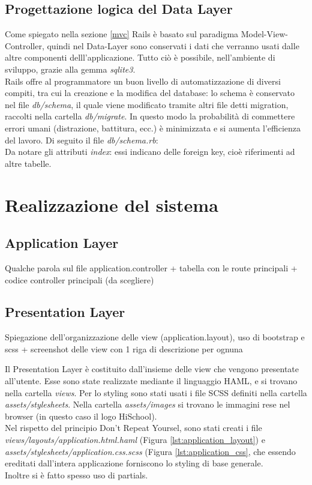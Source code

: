 \documentclass[Lau, binding=0.6cm, oneside]{sapthesis}
\begin{document}
\section{Progettazione logica del Data Layer}

Come spiegato nella sezione \ref{mvc} Rails è basato sul paradigma Model-View-Controller, quindi nel Data-Layer sono conservati i dati che verranno usati dalle altre componenti delll'applicazione. Tutto ciò è possibile, nell'ambiente di sviluppo, grazie alla gemma \textit{sqlite3}.\\
Rails offre al programmatore un buon livello di automatizzazione di diversi compiti, tra cui la creazione e la modifica del database: lo schema è conservato nel file \textit{db/schema}, il quale viene modificato tramite altri file detti migration, raccolti nella cartella \textit{db/migrate}.
In questo modo la probabilità di commettere errori umani (distrazione, battitura, ecc.) è minimizzata e si aumenta l'efficienza del lavoro.
Di seguito il file \textit{db/schema.rb}:\\



Da notare gli attributi \textit{index}: essi indicano delle foreign key, cioè riferimenti ad altre tabelle.

\chapter{Realizzazione del sistema}

\section{Application Layer}

Qualche parola sul file application.controller + tabella con le route principali + codice controller principali (da scegliere)

\section{Presentation Layer}

Spiegazione dell'organizzazione delle view (application.layout), uso di bootstrap e scss + screenshot delle view con 1 riga di descrizione per ognuna

Il Presentation Layer è costituito dall'insieme delle view che vengono presentate all'utente. Esse sono state realizzate mediante il linguaggio HAML, e si trovano nella cartella \textit{views}. Per lo styling sono stati usati i file SCSS definiti nella cartella \textit{assets/stylesheets}. Nella cartella \textit{assets/images} si trovano le immagini rese nel browser (in questo caso il logo HiSchool).\\
Nel rispetto del principio Don't Repeat Yoursel, sono stati creati i file \textit{views/layouts/application.html.haml} (Figura \ref{lst:application_layout}) e \textit{assets/stylesheets/application.css.scss} (Figura \ref{lst:application_css}, che essendo ereditati dall'intera applicazione forniscono lo styling di base generale.\\
Inoltre si è fatto spesso uso di partials.
\end{document}
